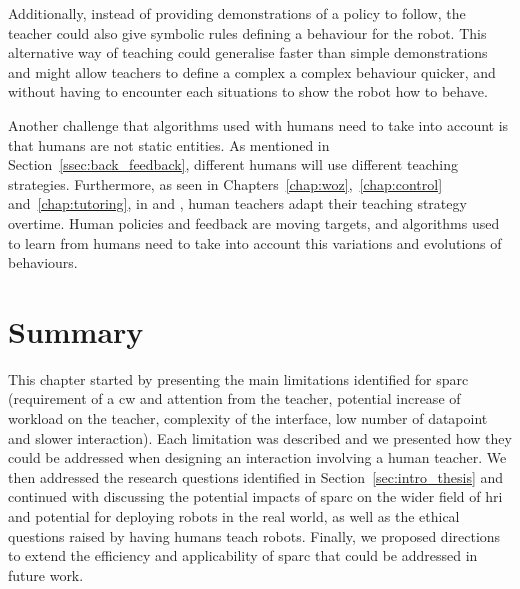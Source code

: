 Additionally, instead of providing demonstrations of a policy to follow, the teacher could also give symbolic rules defining a behaviour for the robot. This alternative way of teaching could generalise faster than simple demonstrations and might allow teachers to define a complex a complex behaviour quicker, and without having to encounter each situations to show the robot how to behave.

Another challenge that algorithms used with humans need to take into account is that humans are not static entities. As mentioned in Section~\ref{ssec:back_feedback}, different humans will use different teaching strategies. Furthermore, as seen in Chapters~\ref{chap:woz},~\ref{chap:control} and~\ref{chap:tutoring}, in \cite{thomaz2008teachable} and \cite{macglashan2017interactive}, human teachers adapt their teaching strategy overtime. Human policies and feedback are moving targets, and algorithms used to learn from humans need to take into account this variations and evolutions of behaviours.

\section{Summary} \label{sec:disc_summary}


This chapter started by presenting the main limitations identified for \gls{sparc} (requirement of a \gls{cw} and attention from the teacher, potential increase of workload on the teacher, complexity of the interface, low number of datapoint and slower interaction). Each limitation was described and we presented how they could be addressed when designing an interaction involving a human teacher. We then addressed the research questions identified in Section~\ref{sec:intro_thesis} and continued with discussing the potential impacts of \gls{sparc} on the wider field of \gls{hri} and potential for deploying robots in the real world, as well as the ethical questions raised by having humans teach robots. Finally, we proposed directions to extend the efficiency and applicability of \gls{sparc} that could be addressed in future work.
